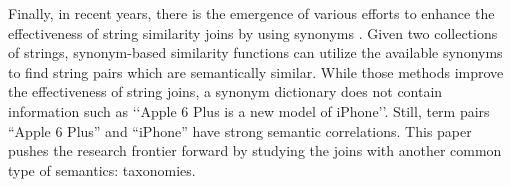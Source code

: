 Finally, in recent years, there is the emergence of various efforts to enhance the effectiveness of string similarity joins by using synonyms \cite{conf/sigmod/LuLWLW13,conf/icde/ArasuCK08,conf/cpm/BarbayGMR06,conf/vldb/ArvindSR09}.
 Given two collections of strings,  synonym-based similarity functions can utilize the available synonyms to find string pairs which are semantically similar. While those methods improve the effectiveness of string joins, a synonym dictionary does not contain information such as `\textsf{`Apple 6 Plus is a new model of iPhone}''. Still, term pairs ``\textsf{Apple 6 Plus}'' and ``\textsf{iPhone}''  have strong semantic correlations. This paper pushes the research frontier forward by studying the joins with another common type of semantics: taxonomies.
